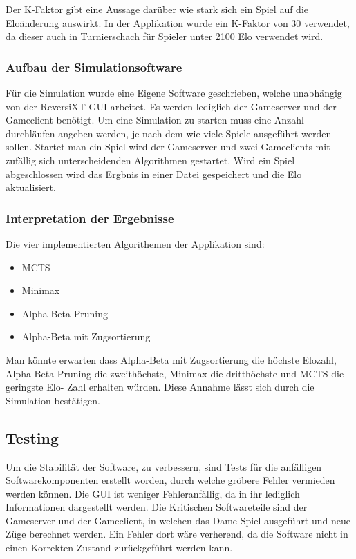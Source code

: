 \documentclass[12pt,a4paper,bibliography=totocnumbered,listof=totocnumbered]{article}
\begin{document}
Der K-Faktor gibt eine Aussage darüber wie stark sich ein Spiel auf die Eloänderung auswirkt. In der Applikation wurde ein K-Faktor von 30 verwendet, da 
dieser auch in Turnierschach für Spieler unter 2100 Elo verwendet wird.

\subsubsection{Aufbau der Simulationsoftware}
Für die Simulation wurde eine Eigene Software geschrieben, welche unabhängig von der ReversiXT GUI arbeitet. 
Es werden lediglich der Gameserver und der Gameclient benötigt. Um eine Simulation zu starten muss eine Anzahl durchläufen angeben werden, je nach dem
wie viele Spiele ausgeführt werden sollen. Startet man ein Spiel wird der Gameserver und zwei Gameclients mit zufällig sich unterscheidenden Algorithmen gestartet.
Wird ein Spiel abgeschlossen wird das Ergbnis in einer Datei gespeichert und die Elo aktualisiert.

\subsubsection{Interpretation der Ergebnisse}
Die vier implementierten Algorithemen der Applikation sind:
\begin{itemize}
    \item MCTS
    \item Minimax 
    \item Alpha-Beta Pruning
    \item Alpha-Beta mit Zugsortierung 
\end{itemize}
Man könnte erwarten dass Alpha-Beta mit Zugsortierung die höchste Elozahl, Alpha-Beta Pruning die zweithöchste, Minimax die dritthöchste und MCTS die geringste Elo-
Zahl erhalten würden. Diese Annahme lässt sich durch die Simulation bestätigen.


\subsection{Testing}
Um die Stabilität der Software, zu verbessern, sind Tests für die anfälligen Softwarekomponenten erstellt worden, durch welche gröbere Fehler vermieden werden können.
Die GUI ist weniger Fehleranfällig, da in ihr lediglich Informationen dargestellt werden. Die Kritischen Softwareteile sind der Gameserver und der Gameclient, 
in welchen das Dame Spiel ausgeführt und neue Züge berechnet werden. Ein Fehler dort wäre verherend, da die Software nicht in einen Korrekten Zustand zurückgeführt
werden kann.
\end{document}

